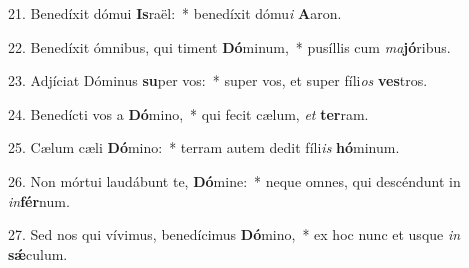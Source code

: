 21. Benedíxit dómui \textbf{Is}raël:~*  benedíxit dómu\textit{i} \textbf{A}aron.\

22. Benedíxit ómnibus, qui timent \textbf{Dó}minum,~*  pusíllis cum \textit{ma}\textbf{jó}ribus.\

23. Adjíciat Dóminus \textbf{su}per vos:~*  super vos, et super fíli\textit{os} \textbf{ves}tros.\

24. Benedícti vos a \textbf{Dó}mino,~*  qui fecit cælum, \textit{et} \textbf{ter}ram.\

25. Cælum cæli \textbf{Dó}mino:~*  terram autem dedit fíli\textit{is} \textbf{hó}minum.\

26. Non mórtui laudábunt te, \textbf{Dó}mine:~*  neque omnes, qui descéndunt in \textit{in}\textbf{fér}num.\

27. Sed nos qui vívimus, benedícimus \textbf{Dó}mino,~*  ex hoc nunc et usque \textit{in} \textbf{sǽ}culum.\

